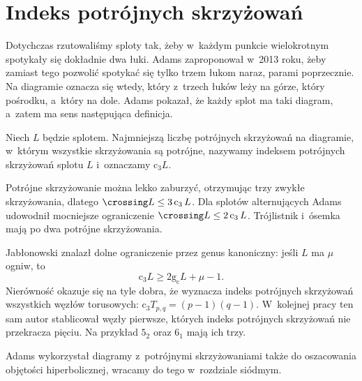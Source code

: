 
\section{Indeks potrójnych skrzyżowań}
%

Dotychczas rzutowaliśmy sploty tak, żeby w~każdym punkcie wielokrotnym spotykały się dokładnie dwa łuki.
Adams \cite{adams2013} zaproponował w~2013 roku, żeby zamiast tego pozwolić spotykać się tylko trzem łukom naraz, parami poprzecznie.
%
Na diagramie oznacza się wtedy, który z~trzech łuków leży na górze, który pośrodku, a~który na dole.
Adams pokazał, że każdy splot ma taki diagram, a~zatem ma sens następująca definicja.

\begin{definition}
    Niech $L$ będzie splotem.
    Najmniejszą liczbę potrójnych skrzyżowań na diagramie, w~którym wszystkie skrzyżowania są potrójne, nazywamy indeksem potrójnych skrzyżowań splotu $L$ i~oznaczamy $\operatorname{c_3} L$.
\end{definition}

Potrójne skrzyżowanie można lekko zaburzyć, otrzymując trzy zwykłe skrzyżowania, dlatego $\crossing L \le 3 \operatorname{c_3} L$.
Dla splotów alternujących Adams udowodnił mocniejsze ograniczenie $\crossing L \le 2 \operatorname{c_3} L$.
Trójlistnik i~ósemka mają po dwa potrójne skrzyżowania.

Jabłonowski \cite{jablonowski2020} znalazł dolne ograniczenie przez genus kanoniczny: jeśli $L$ ma $\mu$ ogniw, to
%
%
\begin{equation}
    \operatorname{c_3} L \ge 2 \operatorname{g_c} L + \mu - 1.
\end{equation}
Nierówność okazuje się na tyle dobra, że wyznacza indeks potrójnych skrzyżowań wszystkich węzłów torusowych: $\operatorname{c_3} T_{p, q} = (p-1)(q-1)$.
%
W~kolejnej pracy \cite{jablonowski2023} ten sam autor stablicował węzły pierwsze, których indeks potrójnych skrzyżowań nie przekracza pięciu.
Na przykład $5_2$ oraz $6_1$ mają ich trzy.

Adams wykorzystał diagramy z~potrójnymi skrzyżowaniami także do oszacowania objętości hiperbolicznej, wracamy do tego w~rozdziale siódmym.
%

%

